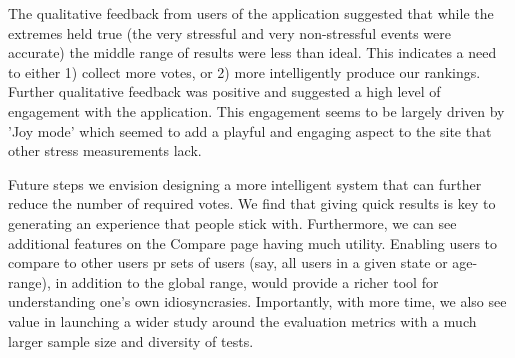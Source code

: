 \documentclass{sigchi}
\begin{document}
The qualitative feedback from users of the application suggested that while the extremes held true (the very stressful and very non-stressful events were accurate) the middle range of results were less than ideal. This indicates a need to either 1) collect more votes, or 2) more intelligently produce our rankings. Further qualitative feedback was positive and suggested a high level of engagement with the application. This engagement seems to be largely driven by 'Joy mode' which seemed to add a playful and engaging aspect to the site that other stress measurements lack. 

Future steps we envision designing a more intelligent system that can further reduce the number of required votes. We find that giving quick results is key to generating an experience that people stick with. Furthermore, we can see additional features on the Compare page having much utility. Enabling users to compare to other users pr sets of users (say, all users in a given state or age-range), in addition to the global range, would provide a richer tool for understanding one's own idiosyncrasies. Importantly, with more time, we also see value in launching a wider study around the evaluation metrics with a much larger sample size and diversity of tests.



\balance




\end{document}
